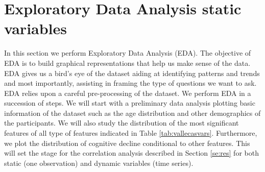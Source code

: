 \documentclass[11pt]{article}
\theoremstyle{definition}
\theoremstyle{remark}
\begin{document}



\section{Exploratory Data Analysis static variables}
\label{sse:eda}
In this section we perform Exploratory Data Analysis (EDA). The objective of EDA is to build graphical representations that help us make sense of the data. EDA gives us a bird's eye of the dataset aiding at identifying patterns and trends and most importantly, assisting in framing the type of questions we want to ask.
EDA relies upon a careful pre-processing of the dataset. We perform EDA in a succession of steps. We will start with a preliminary data analysis plotting basic information of the dataset such as the age distribution and other demographics of the participants. 
We will also study the distribution of the most significant features of all type of features indicated in Table \ref{tab:vallecasvars}. Furthermore, we plot the distribution of cognitive decline conditional to other features. This will set the stage for the correlation analysis described in Section \ref{se:res} for both static (one observation) and dynamic variables (time series).
\end{document}
